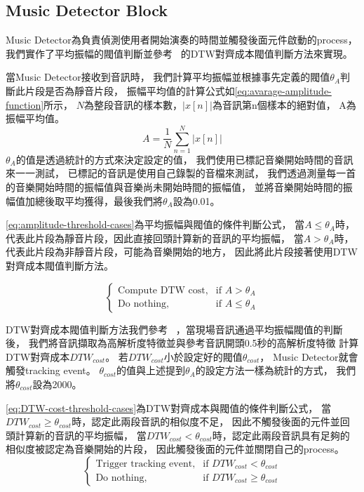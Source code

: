 \documentclass[class=NCU_thesis, crop=false]{standalone}
\begin{document}
\subsection{Music Detector Block} \label{ch3-subst-music-detector}
Music Detector為負責偵測使用者開始演奏的時間並觸發後面元件啟動的process，
我們實作了平均振幅的閥值判斷並參考~\cite{Lin2020AHumanComputerDuetSystem}
的DTW對齊成本閥值判斷方法來實現。

當Music Detector接收到音訊時，
我們計算平均振幅並根據事先定義的閥值$\theta _{A}$判斷此片段是否為靜音片段，
振幅平均值的計算公式如\cref{eq:avarage-amplitude-function}所示，
$N$為整段音訊的樣本數，$| x[n] \vert$為音訊第n個樣本的絕對值，
A為振幅平均值。
\begin{equation}
    \label{eq:avarage-amplitude-function}
    A = \frac{1}{N} \sum _{n=1}^{N} | x[n] \vert 
\end{equation}
$\theta _{A}$的值是透過統計的方式來決定設定的值，
我們使用已標記音樂開始時間的音訊來一一測試，
已標記的音訊是使用自己錄製的音檔來測試，
我們透過測量每一首的音樂開始時間的振幅值與音樂尚未開始時間的振幅值，
並將音樂開始時間的振幅值加總後取平均獲得，最後我們將$\theta _{A}$設為0.01。

\cref{eq:amplitude-threshold-cases}為平均振幅與閥值的條件判斷公式，
當$A \leq \theta _{A}$時，代表此片段為靜音片段，因此直接回頭計算新的音訊的平均振幅，
當$A > \theta _{A}$時，代表此片段為非靜音片段，可能為音樂開始的地方，
因此將此片段接著使用DTW對齊成本閥值判斷方法。

\begin{equation} 
    \label{eq:amplitude-threshold-cases}
    \begin{cases}
        \text{Compute DTW cost}, & \text{if $A > \theta _{A}$} \\
        \text{Do nothing},  & \text{if $A \leq \theta _{A}$}
    \end{cases}
\end{equation}

DTW對齊成本閥值判斷方法我們參考~\cite{Lin2020AHumanComputerDuetSystem}
，當現場音訊通過平均振幅閥值的判斷後，
我們將音訊擷取為高解析度特徵並與參考音訊開頭0.5秒的高解析度特徵
計算DTW對齊成本${DTW_{cost}}$。
若${DTW_{cost}}$小於設定好的閥值$\theta _{cost}$，
Music Detector就會觸發tracking event。
$\theta _{cost}$的值與上述提到$\theta _{A}$的設定方法一樣為統計的方式，
我們將$\theta _{cost}$設為2000。

\cref{eq:DTW-cost-threshold-cases}為DTW對齊成本與閥值的條件判斷公式，
當$DTW_{cost} \geq \theta _{cost}$時，認定此兩段音訊的相似度不足，
因此不觸發後面的元件並回頭計算新的音訊的平均振幅，
當$DTW_{cost}  < \theta _{cost}$時，認定此兩段音訊具有足夠的相似度被認定為音樂開始的片段，
因此觸發後面的元件並關閉自己的process。
\begin{equation}
    \label{eq:DTW-cost-threshold-cases}
    \begin{cases}
        \text{Trigger tracking event}, & \text{if $DTW_{cost} < \theta _{cost}$} \\
        \text{Do nothing}, & \text{if $DTW_{cost} \geq \theta _{cost}$}
    \end{cases}
\end{equation}
\end{document}
